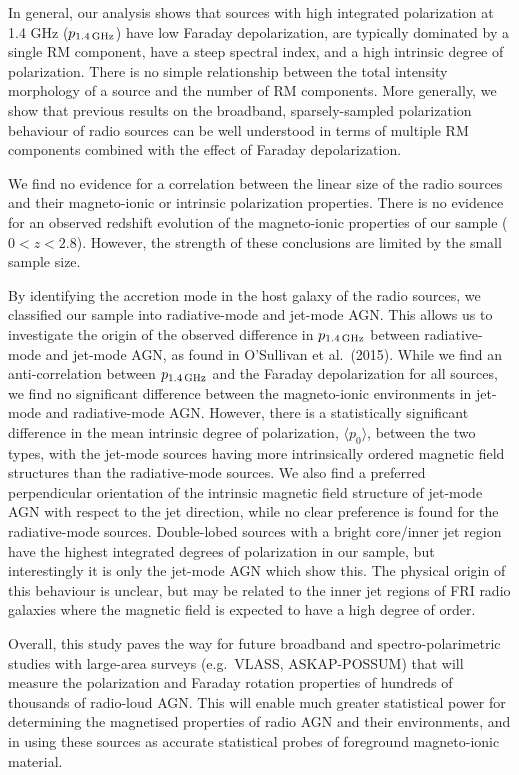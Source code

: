 \documentclass{mnras}
\begin{document}
In general, our analysis shows that sources with high integrated polarization at 1.4 GHz ($p_{1.4\,{\rm GHz}}$) have low Faraday depolarization, are typically dominated by a single RM component, have a steep spectral index, and a high intrinsic degree of polarization. 
There is no simple relationship between the total intensity morphology of a source and the number of RM components. 
More generally, we show that previous results on the broadband, sparsely-sampled polarization behaviour of radio sources can be well understood in terms of multiple RM components combined with the effect of Faraday depolarization. 

We find no evidence for a correlation between the linear size of the radio sources and their magneto-ionic or intrinsic polarization properties. 
There is no evidence for an observed redshift evolution of the magneto-ionic properties of our sample ($0<z<2.8$). However, the strength of these conclusions are limited by the small sample size. 

By identifying the accretion mode in the host galaxy of the radio sources, we classified our sample into radiative-mode and jet-mode AGN.
This allows us to investigate the origin of the observed difference in $p_{1.4\,{\rm GHz}}$ between radiative-mode and jet-mode AGN, as found in O'Sullivan et al.~(2015). 
While we find an anti-correlation between $p_{1.4\,{\rm GHz}}$ and the Faraday depolarization for all sources, we find no significant difference between the magneto-ionic environments in jet-mode and radiative-mode AGN. However, there is a statistically significant difference in the mean intrinsic degree of polarization, $\langle p_0 \rangle$, between the two types, with the jet-mode sources having more intrinsically ordered magnetic field structures than the radiative-mode sources.
We also find a preferred perpendicular orientation of the intrinsic magnetic field structure of jet-mode AGN with respect to the jet direction, while no clear preference is found for the radiative-mode sources. 
Double-lobed sources with a bright core/inner jet region have the highest integrated degrees of polarization in our sample, but interestingly it is only the jet-mode AGN which show this. The physical origin of this behaviour is unclear, but may be related to the inner jet regions of FRI radio galaxies where the magnetic field is expected to have a high degree of order. 

Overall, this study paves the way for future broadband and spectro-polarimetric studies with large-area surveys (e.g.~VLASS, ASKAP-POSSUM) that will measure the polarization and Faraday rotation properties of hundreds of thousands of radio-loud AGN. This will enable much greater statistical power for determining the magnetised properties of radio AGN and their environments, and in using these sources as accurate statistical probes of foreground magneto-ionic material. 
\end{document}
